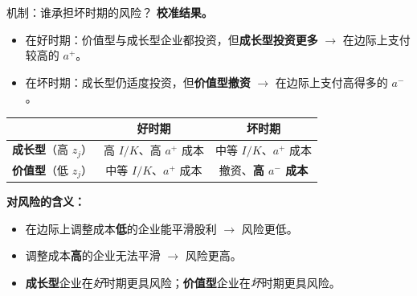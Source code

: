 \documentclass{beamer}
\begin{document}
\begin{frame}{机制：谁承担坏时期的风险？}
    \textbf{校准结果。}
    \begin{itemize}
        \item 在好时期：价值型与成长型企业都投资，但\textbf{成长型投资更多} $\rightarrow$ 在边际上支付较高的 $a^+$。
        \item 在坏时期：成长型仍适度投资，但\textbf{价值型撤资} $\rightarrow$ 在边际上支付高得多的 $a^-$。
    \end{itemize}

    \vspace{0.2cm}
    \begin{center}
        \small
        \begin{tabular}{@{}lcc@{}}
            \toprule
            & \textbf{好时期} & \textbf{坏时期} \\
            \midrule
            \textbf{成长型}（高 $z_j$） & 高 $I/K$、高 $a^+$ 成本 & 中等 $I/K$、$a^+$ 成本 \\
            \textbf{价值型}（低 $z_j$） & 中等 $I/K$、$a^+$ 成本 & 撤资、\textbf{高 $a^-$ 成本} \\
            \bottomrule
        \end{tabular}
    \end{center}

    \vspace{0.2cm}
    \textbf{对风险的含义：}
    \begin{itemize}
        \item 在边际上调整成本\textbf{低}的企业能平滑股利 $\rightarrow$ 风险更低。
        \item 调整成本\textbf{高}的企业无法平滑 $\rightarrow$ 风险更高。
        \item \textbf{成长型}企业在\textit{好}时期更具风险；\textbf{价值型}企业在\textit{坏}时期更具风险。
    \end{itemize}
\end{frame}
\end{document}
